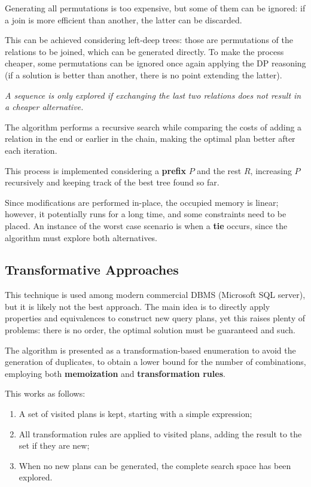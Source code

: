 Generating all permutations is too expensive, but some of them can be ignored: if a join is more efficient than another, the latter can be discarded.

This can be achieved considering left-deep trees: those are permutations of the relations to be joined, which can be generated directly. To make the process cheaper, some permutations can be ignored once again applying the DP reasoning (if a solution is better than another, there is no point extending the latter).

\textit{A sequence is only explored if exchanging the last two relations does not result in a cheaper alternative. }

The algorithm performs a recursive search while comparing the costs of adding a relation in the end or earlier in the chain, making the optimal plan better after each iteration. 

This process is implemented considering a \textbf{prefix} $P$ and the rest $R$, increasing $P$ recursively and keeping track of the best tree found so far. 

Since modifications are performed in-place, the occupied memory is linear; however, it potentially runs for a long time, and some constraints need to be placed. An instance of the worst case scenario is when a \textbf{tie} occurs, since the algorithm must explore both alternatives. 

\subsection{Transformative Approaches}
This technique is used among modern commercial DBMS (Microsoft SQL server), but it is likely not the best approach. The main idea is to directly apply properties and equivalences to construct new query plans, yet this raises plenty of problems: there is no order, the optimal solution must be guaranteed and such.

The algorithm is presented as a transformation-based enumeration to avoid the generation of duplicates, to obtain a lower bound for the number of combinations, employing both \textbf{memoization} and \textbf{transformation rules}.

This works as follows:
\begin{enumerate}
	\item A set of visited plans is kept, starting with a simple expression;
	\item All transformation rules are applied to visited plans, adding the result to the set if they are new;
	\item When no new plans can be generated, the complete search space has been explored.
\end{enumerate}

